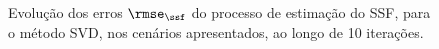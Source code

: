 \begin{figure}[t]
\begin{subfigure}[t]{0.9\linewidth}
	\end{subfigure}
	
	\vspace*{0.5em}
	\caption{Evolução dos erros $\rmse_{\ssf}$ do processo de estimação do SSF, para o método SVD, nos cenários apresentados, ao longo de 10 iterações.}
	\label{fig:sec7:ssf_rms_errors_svd}
\end{figure}